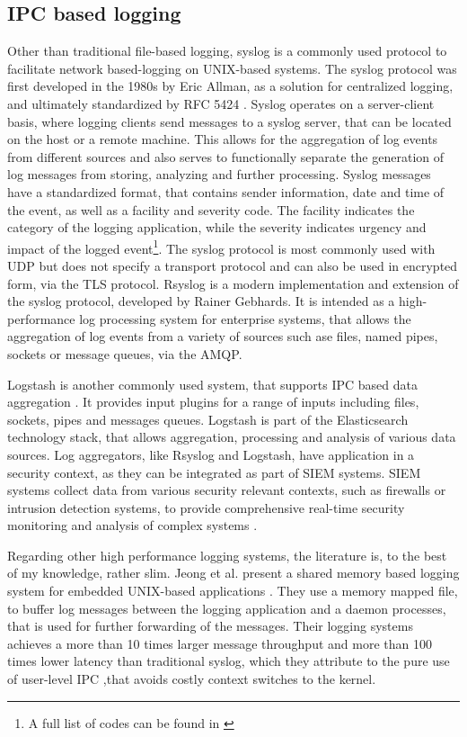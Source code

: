 \subsection{IPC based logging} \label{sec:ipc_logging}
Other than traditional file-based logging, syslog is a commonly used protocol to facilitate network based-logging
on UNIX-based systems. The syslog protocol was first developed in the 1980s by Eric Allman, as a solution
for centralized logging, and ultimately standardized by RFC 5424 \cite{gerhards2009}. Syslog operates on a server-client
basis, where logging clients send messages to a syslog server, that can be located on the host or a remote machine. This allows for
the aggregation of log events from different sources and also serves to functionally separate the generation of log messages from storing, analyzing
and further processing. 
Syslog messages have a standardized format, that contains sender information, date and time of the event, as well as a facility and severity code. The facility indicates
the category of the logging application, while the severity indicates urgency and impact of the logged event\footnote{A full list of codes can be found in \cite[p.10-11]{gerhards2009}}. 
The syslog protocol is most commonly used with \ac{UDP} but does not specify a transport protocol and can also be used in 
encrypted form, via the \ac{TLS} protocol. 
Rsyslog is a modern implementation and extension of the syslog protocol, developed by Rainer Gebhards\cite{rsyslog}.
It is intended as a high-performance log processing system for enterprise systems, that allows the aggregation of log events
from a variety of sources such ase files, named pipes, sockets or message queues, via the \ac{AMQP}\cite{vinoski2006advanced}. 
\par
Logstash is another commonly used system, that supports \ac{IPC} based data aggregation \cite{logstash}. It provides input 
plugins for a range of inputs including files, sockets, pipes and messages queues. Logstash is part of the Elasticsearch technology stack, that allows 
aggregation, processing and analysis of various data sources. Log aggregators, like Rsyslog and Logstash, have application in a security context,
as they can be integrated as part of \ac{SIEM} systems. \ac{SIEM} systems collect data from various security relevant contexts, such as firewalls or intrusion detection 
systems, to provide comprehensive real-time security monitoring and analysis of complex systems \cite{bhatt2014operational}.
\par
Regarding other high performance logging systems, the literature is, to the best of my knowledge, rather slim.
Jeong et al. present a shared memory based logging system for embedded UNIX-based applications \cite{jeong2013high}.
They use a memory mapped file, to buffer log messages between the logging application and a daemon processes, that is used for further forwarding of the messages.
Their logging systems achieves a more than 10 times larger message throughput and more than 100 times lower latency than traditional syslog, which they attribute 
to the pure use of user-level \ac{IPC} ,that avoids costly context switches to the kernel. 


